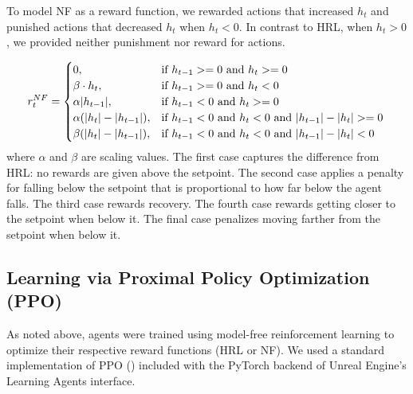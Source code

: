To model NF as a reward function, we rewarded actions that increased \(h_t\) and punished actions that decreased \(h_t\) when \(h_t < 0\). In contrast to HRL, when \(h_t > 0\), we provided neither punishment nor reward for actions.

\begin{equation*}
    r^{NF}_t =
    \begin{cases}
        0,                       & \text{if } h_{t-1} >= 0 \text{ and } h_t >= 0                                   \\
        \beta \cdot h_t,         & \text{if } h_{t-1} >= 0 \text{ and } h_t < 0                                    \\
        \alpha|h_{t-1}|,         & \text{if } h_{t-1} < 0 \text{ and } h_t >= 0                                    \\
        \alpha(|h_t|-|h_{t-1}|), & \text{if } h_{t-1} < 0 \text{ and } h_t < 0 \text{ and } |h_{t-1}| - |h_t| >= 0 \\
        \beta(|h_t|-|h_{t-1}|),  & \text{if } h_{t-1} < 0 \text{ and } h_t < 0 \text{ and } |h_{t-1}| - |h_t| < 0
    \end{cases} \\
\end{equation*}
where \(\alpha\) and \(\beta\) are scaling values. The first case captures the difference from HRL: no rewards are given above the setpoint. The second case applies a penalty for falling below the setpoint that is proportional to how far below the agent falls. The third case rewards recovery. The fourth case rewards getting closer to the setpoint when below it. The final case penalizes moving farther from the setpoint when below it.

\subsection{Learning via Proximal Policy Optimization (PPO)}

As noted above, agents were trained using model-free reinforcement learning to optimize their respective reward functions (HRL or NF). We used a standard implementation of PPO (\cite{schulman_proximal_2017}) included with the PyTorch backend of Unreal Engine’s Learning Agents interface.

